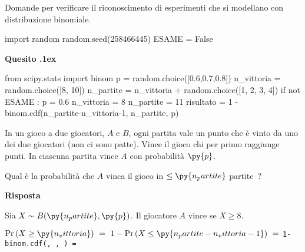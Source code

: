 \documentclass[11pt,twoside,a4paper]{article}
\newcounter{quesito}
\newenvironment{question}{\bigskip\addtocounter{quesito}{1}\bigskip\bigskip\par\textbf{Quesito \thequesito.\kern1ex}}{\vspace{\parskip}}
\newenvironment{answer}{\par\textbf{Risposta\quad}}{\vspace{\parskip}}
\begin{document}
\colorbox{blue!10}{\begin{minipage}{\textwidth}
Domande  per verificare il riconoscimento di esperimenti che si modellano con distribuzione binomiale.
\end{minipage}}

\bigskip\bigskip


\begin{pycode}
import random
random.seed(258466445)
ESAME = False
\end{pycode}


\begin{question}
\def\Pr{{\rm Pr\,}}
\def\Ex{{\rm E\,}}
\def\Var{{\rm Var\,}}
\begin{pycode}
from scipy.stats import binom
p = random.choice([0.6,0.7,0.8])
n_vittoria = random.choice([8, 10])
n_partite = n_vittoria + random.choice([1, 2, 3, 4])
if not ESAME :
   p = 0.6
   n_vittoria = 8
   n_partite = 11
risultato = 1 - binom.cdf(n_partite-n_vittoria-1, n_partite, p)
\end{pycode}
In un gioco a due giocatori, $A$ e $B$, ogni partita vale un punto che è vinto da uno dei due giocatori (non ci sono patte). Vince il gioco chi per primo raggiunge  punti. In ciascuna partita vince $A$ con probabilità $\py{p}$.

Qual è la probabilità che $A$ vinca il gioco in $\le\py{n_partite}$ partite~?
\begin{answer}

Sia $X\sim B(\py{n_partite},\py{p})$. Il giocatore $A$ vince se $X\ge 8$. 

$\displaystyle\Pr(X\ge\py{n_vittoria})\ =\ 1-\Pr( X\le\py{n_partite-n_vittoria-1} )\ =\ ${\tt\color{blue}1-binom.cdf(, , ) = }{\tt{} }
\end{answer}
\end{question}
\end{document}
